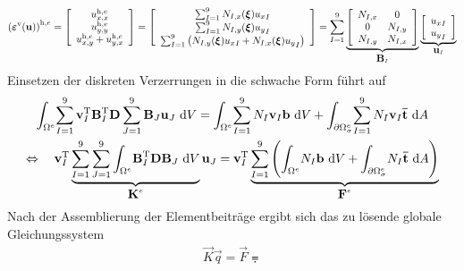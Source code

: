 \documentclass[12pt,bibstyle=none,pagenumberinfooter]{ifmdocument}
\begin{document}
\begin{gather*}
	\left(\mbox{\boldmath $\mathrm{\varepsilon}$}^{\mathrm{v}}(\mbox{\boldmath $\mathrm{u}$})\right)^{\mathrm{h},e} = \left[ \begin{array}{c}
		u^{\mathrm{h},e}_{x,x} \\ 
		u^{\mathrm{h},e}_{y,y} \\ 
		u^{\mathrm{h},e}_{x,y} + u^{\mathrm{h},e}_{y,x}\\
	\end{array}\right] =
	 \left[ \begin{array}{c}
		\sum_{I=1}^{9}N_{I,x}(\mbox{\boldmath $\mathrm{\xi}$}){u_x}_I \\ 
		\sum_{I=1}^{9}N_{I,y}(\mbox{\boldmath $\mathrm{\xi}$}){u_y}_I \\ 
		\sum_{I=1}^{9}\left(N_{I,y}(\mbox{\boldmath $\mathrm{\xi}$}){u_x}_I+N_{I,x}(\mbox{\boldmath $\mathrm{\xi}$}){u_y}_I\right)\\
	\end{array}\right] 
= \sum_{I=1}^{9}
		\underbrace{\left[ \begin{array}{cc}
			N_{I,x} & 0 \\ 
			0 & N_{I,y} \\ 
			N_{I,y} & N_{I,x} \\
		\end{array}\right]}_{\mbox{\boldmath $\mathrm{B}$}_I} \underbrace{\left[ \begin{array}{c}
		{u_x}_I \\ 
		{u_y}_I \\ 
	\end{array}\right]}_{\mbox{\boldmath $\mathrm{u}$}_I}
\end{gather*}
Einsetzen der diskreten Verzerrungen in die schwache Form f\"uhrt auf
\begin{gather*}
	\int_{\Omega^e}\!\sum_{I=1}^{9} \mbox{\boldmath $\mathrm{v}$}^{\mathrm{T}}_I \mbox{\boldmath $\mathrm{B}$}_I^\mathrm{T} \mbox{\boldmath $\mathrm{D}$} \sum_{J=1}^{9} \mbox{\boldmath $\mathrm{B}$}_J \mbox{\boldmath $\mathrm{u}$}_J\, \,\mathrm{d} V = \int_{\Omega^e}\!\sum_{I=1}^{9} N_I \mbox{\boldmath $\mathrm{v}$}_I\mbox{\boldmath $\mathrm{b}$}\, \,\mathrm{d} V + \int_{\partial\Omega_\sigma^e}\!\sum_{I=1}^{9} N_I \mbox{\boldmath $\mathrm{v}$}_I \mbox{\boldmath $\mathrm{\bar{t}}$}\, \,\mathrm{d} A\\
	\Leftrightarrow \quad \mbox{\boldmath $\mathrm{v}$}^{\mathrm{T}}_I \underbrace{\sum_{I=1}^{9} \sum_{J=1}^{9} \int_{\Omega^e}\!  \mbox{\boldmath $\mathrm{B}$}_I^{\mathrm{T}} \mbox{\boldmath $\mathrm{D}$}  \mbox{\boldmath $\mathrm{B}$}_J \, \,\mathrm{d} V}_{\mbox{\boldmath $\mathrm{K}$}^e} \mbox{\boldmath $\mathrm{u}$}_J = \mbox{\boldmath $\mathrm{v}$}_I^{\mathrm{T}} \underbrace{\sum_{I=1}^{9} \left(\int_{\Omega^e}\! N_I \mbox{\boldmath $\mathrm{b}$}\, \,\mathrm{d} V + \int_{\partial\Omega_\sigma^e}\! N_I \mbox{\boldmath $\mathrm{\bar{t}}$}\, \,\mathrm{d} A \right)}_{\mbox{\boldmath $\mathrm{F}$}^e}
\end{gather*}
Nach der Assemblierung der Elementbeiträge ergibt sich das zu l\"osende globale Gleichungssystem 
\begin{gather}
	\vec{K}\vec{q} = \vec{F} \eqdot \label{eq:LGS}
\end{gather}
\end{document}
